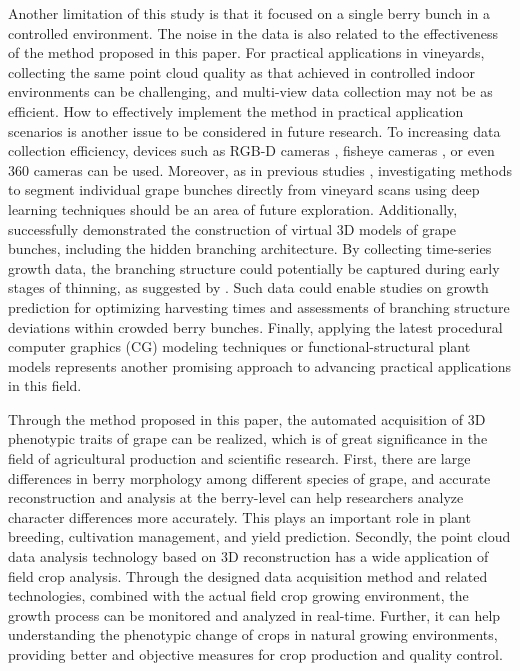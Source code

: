 \documentclass[12pt]{article}
\begin{document}
Another limitation of this study is that it focused on a single berry bunch in a controlled environment.
The noise in the data is also related to the effectiveness of the method proposed in this paper.
For practical applications in vineyards, collecting the same point cloud quality as that achieved in controlled indoor environments can be challenging, and multi-view data collection may not be as efficient.
How to effectively implement the method in practical application scenarios is another issue to be considered in future research.
To increasing data collection efficiency, devices such as RGB-D cameras \citep{blok_highthroughput_2025}, fisheye cameras \citep{tamura_unsupervised_2025}, or even 360 cameras can be used.
Moreover, as in previous studies \citep{rose_automated_2016, luo_3d_2023}, investigating methods to segment individual grape bunches directly from vineyard scans using deep learning techniques should be an area of future exploration.
Additionally, \citet[Fig.~9]{scholer_automated_2015} successfully demonstrated the construction of virtual 3D models of grape bunches, including the hidden branching architecture. 
By collecting time-series growth data, the branching structure could potentially be captured during early stages of thinning, as suggested by \citep{du_instance_2023}.
Such data could enable studies on growth prediction for optimizing harvesting times and assessments of branching structure deviations within crowded berry bunches.
Finally, applying the latest procedural computer graphics (CG) modeling techniques or functional-structural plant models represents another promising approach to advancing practical applications in this field.

Through the method proposed in this paper, the automated acquisition of 3D phenotypic traits of grape can be realized, which is of great significance in the field of agricultural production and scientific research. 
First, there are large differences in berry morphology among different species of grape, and accurate reconstruction and analysis at the berry-level can help researchers analyze character differences more accurately. 
This plays an important role in plant breeding, cultivation management, and yield prediction. 
Secondly, the point cloud data analysis technology based on 3D reconstruction has a wide application of field crop analysis. 
Through the designed data acquisition method and related technologies, combined with the actual field crop growing environment, the growth process can be monitored and analyzed in real-time. 
Further, it can help understanding the phenotypic change of crops in natural growing environments, providing better and objective measures for crop production and quality control. 
\end{document}
